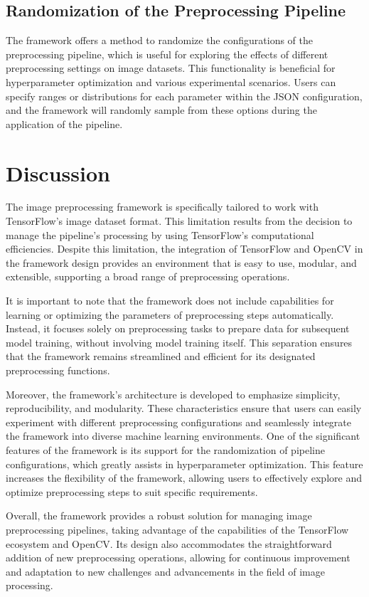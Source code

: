 \documentclass[journal]{new-aiaa}
\begin{document}
\subsection{Randomization of the Preprocessing Pipeline}
The framework offers a method to randomize the configurations of the preprocessing pipeline, which is useful for exploring the effects of different preprocessing settings on image datasets. This functionality is beneficial for hyperparameter optimization and various experimental scenarios. Users can specify ranges or distributions for each parameter within the JSON configuration, and the framework will randomly sample from these options during the application of the pipeline.


\section{Discussion}
The image preprocessing framework is specifically tailored to work with TensorFlow's image dataset format. This limitation results from the decision to manage the pipeline's processing by using TensorFlow's computational efficiencies. Despite this limitation, the integration of TensorFlow and OpenCV in the framework design provides an environment that is easy to use, modular, and extensible, supporting a broad range of preprocessing operations.

It is important to note that the framework does not include capabilities for learning or optimizing the parameters of preprocessing steps automatically. Instead, it focuses solely on preprocessing tasks to prepare data for subsequent model training, without involving model training itself. This separation ensures that the framework remains streamlined and efficient for its designated preprocessing functions.

Moreover, the framework's architecture is developed to emphasize simplicity, reproducibility, and modularity. These characteristics ensure that users can easily experiment with different preprocessing configurations and seamlessly integrate the framework into diverse machine learning environments. One of the significant features of the framework is its support for the randomization of pipeline configurations, which greatly assists in hyperparameter optimization. This feature increases the flexibility of the framework, allowing users to effectively explore and optimize preprocessing steps to suit specific requirements.

Overall, the framework provides a robust solution for managing image preprocessing pipelines, taking advantage of the capabilities of the TensorFlow ecosystem and OpenCV. Its design also accommodates the straightforward addition of new preprocessing operations, allowing for continuous improvement and adaptation to new challenges and advancements in the field of image processing.
\end{document}
